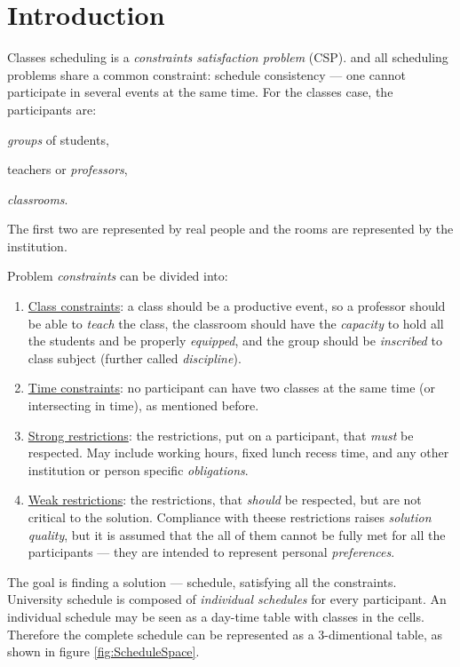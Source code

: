 
\section{Introduction}

Classes scheduling is a \emph{constraints satisfaction problem} (CSP).
and all scheduling problems share a common constraint: schedule consistency ---
one cannot participate in several events at the same time. For the classes case,
the participants are:
\begin{enumerate*}[1)]
  \item \emph{groups} of students,
  \item teachers or \emph{professors},
  \item \emph{classrooms}.
\end{enumerate*}
The first two are represented by real people and the rooms are represented by
the institution.




Problem \emph{constraints} can be divided into:
\begin{enumerate}
  \item \underline{Class constraints}: a class should be a productive event, so
    a professor should be able to \emph{teach} the class, the classroom should
    have the \emph{capacity} to hold all the students and be properly \emph{equipped},
    and the group should be \emph{inscribed} to class subject
    (further called \emph{discipline}).
  \item \underline{Time constraints}: no participant can have two classes
    at the same time (or intersecting in time), as mentioned before.
  \item \underline{Strong restrictions}: the restrictions, put on a participant, that
    \emph{must} be respected. May include working hours, fixed lunch recess time,
    and any other institution or person specific \emph{obligations}.
  \item \underline{Weak restrictions}: the restrictions, that \emph{should} be respected,
    but are not critical to the solution. Compliance with theese restrictions
    raises \emph{solution quality}, but it is assumed that the all of them
    cannot be fully met for all the participants --- they are intended to
    represent personal \emph{preferences}.
\end{enumerate}

The goal is finding a solution --- schedule, satisfying all the constraints.
University schedule is composed of \emph{individual schedules} for every
participant. An individual schedule may be seen as a day-time table with
classes in the cells. Therefore the complete schedule can be represented as a
3-dimentional table, as shown in figure \ref{fig:ScheduleSpace}.
\bigskip


